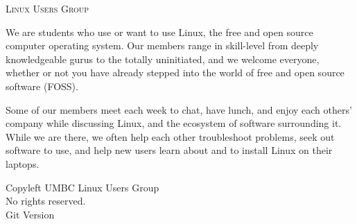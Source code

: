 \documentclass[11pt]{article}
\newcommand{\foss}{FOSS}
\begin{document}
\begin{center} \scshape \LARGE
    Linux Users Group
    \vspace{0.5em}
\end{center}

We are students who use or want to use Linux, the free and open source computer
operating system. Our members range in skill-level from deeply knowledgeable
gurus to the totally uninitiated, and we welcome everyone, whether or not you
have already stepped into the world of free and open source software (\foss).

Some of our members meet each week to chat, have lunch, and enjoy each others'
company while discussing Linux, and the ecosystem of software surrounding it.
While we are there, we often help each other troubleshoot problems, seek out
software to use, and help new users learn about and to install Linux on their
laptops.

\vfill
\begin{center} \tiny
    \textcopyleft{} Copyleft \the\year{} UMBC Linux Users Group \\
    No rights reserved. \\
    Git Version 
\end{center}
\end{document}
